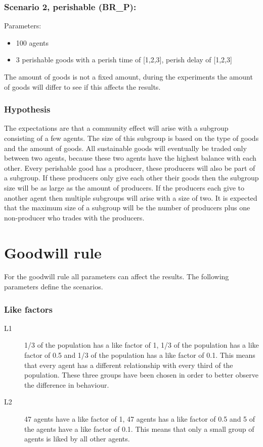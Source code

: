 \documentclass[twoside,openright]{uva-bachelor-thesis}
\begin{document}
\subsubsection{Scenario 2, perishable (BR\_P):}
Parameters:
\begin{itemize}
\item 100 agents
\item 3 perishable goods with a perish time of [1,2,3], perish delay of [1,2,3]
\end{itemize}
The amount of goods is not a fixed amount, during the experiments the amount of goods will differ to see if this affects the results.

\subsubsection{Hypothesis}
The expectations are that a community effect will arise with a subgroup consisting of a few agents. The size of this subgroup is based on the type of goods and the amount of goods. All sustainable goods will eventually be traded only between two agents, because these two agents have the highest balance with each other. Every perishable good has a producer, these producers will also be part of a subgroup. If these producers only give each other their goods then the subgroup size will be as large as the amount of producers. If the producers each give to another agent then multiple subgroups will arise with a size of two. It is expected that the maximum size of a subgroup will be the number of producers plus one non-producer who trades with the producers.

\section{Goodwill rule}
For the goodwill rule all parameters can affect the results. The following parameters define the scenarios.
\subsubsection{Like factors}
\begin{description}
\item[L1] 1/3 of the population has a like factor of 1, 1/3 of the population has a like factor of 0.5 and 1/3 of the population has a like factor of 0.1. This means that every agent has a different relationship with every third of the population. These three groups have been chosen in order to better observe the difference in behaviour.
\item[L2] 47 agents have a like factor of 1, 47 agents has a like factor of 0.5 and 5 of the agents have a like factor of 0.1. This means that only a small group of agents is liked by all other agents.
\end{description}
\end{document}
